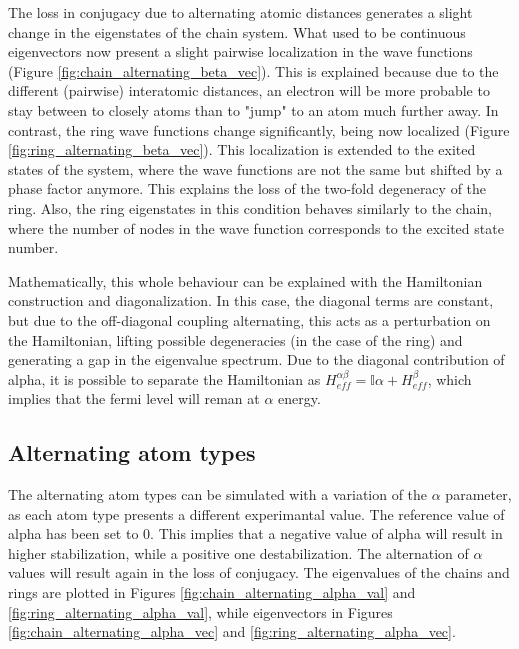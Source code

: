 \documentclass[twocolumn]{article}
\begin{document}
The loss in conjugacy due to alternating atomic distances generates a slight change in the eigenstates of the chain system. What used to be continuous eigenvectors now present a slight pairwise localization in the wave functions (Figure \ref{fig:chain_alternating_beta_vec}). This is explained because due to the different (pairwise) interatomic distances, an electron will be more probable to stay between to closely atoms than to "jump" to an atom much further away. In contrast, the ring wave functions change significantly, being now localized (Figure \ref{fig:ring_alternating_beta_vec}). This localization is extended to the exited states of the system, where the wave functions are not the same but shifted by a phase factor anymore. This explains the loss of the two-fold degeneracy of the ring.  Also, the ring eigenstates in this condition behaves similarly to the chain, where the number of nodes in the wave function corresponds to the excited state number.

Mathematically, this whole behaviour can be explained with the Hamiltonian construction and diagonalization. In this case, the diagonal terms are constant, but due to the off-diagonal coupling alternating, this acts as a perturbation on the Hamiltonian, lifting possible degeneracies (in the case of the ring) and generating a gap in the eigenvalue spectrum. Due to the diagonal contribution of alpha, it is possible to separate the Hamiltonian as $H_{eff}^{\alpha\beta} = \mathbb{I} \alpha + H_{eff}^\beta$, which implies that the fermi level will reman at $\alpha$ energy. 

\subsection{Alternating atom types}
The alternating atom types can be simulated with a variation of the $\alpha$ parameter, as each atom type presents a different experimantal value. The reference value of alpha has been set to $0$. This implies that a negative value of alpha will result in higher stabilization, while a positive one destabilization. The alternation of $\alpha$ values will result again in the loss of conjugacy. The eigenvalues of the chains and rings are plotted in Figures \ref{fig:chain_alternating_alpha_val} and \ref{fig:ring_alternating_alpha_val}, while eigenvectors in Figures \ref{fig:chain_alternating_alpha_vec} and \ref{fig:ring_alternating_alpha_vec}.
\end{document}
